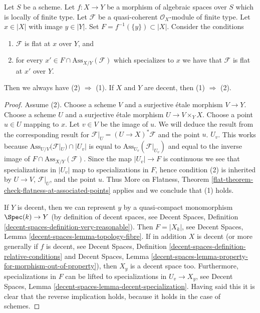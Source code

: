 \begin{theorem}
\label{theorem-check-flatness-at-associated-points}
Let $S$ be a scheme.
Let $f : X \to Y$ be a morphism of algebraic spaces over $S$
which is locally of finite type.
Let $\mathcal{F}$ be a quasi-coherent $\mathcal{O}_X$-module of finite type.
Let $x \in |X|$ with image $y \in |Y|$.
Set $F = f^{-1}(\{y\}) \subset |X|$.
Consider the conditions
\begin{enumerate}
\item $\mathcal{F}$ is flat at $x$ over $Y$, and
\item for every $x' \in F \cap \text{Ass}_{X/Y}(\mathcal{F})$ which
specializes to $x$ we have that $\mathcal{F}$ is flat at $x'$ over $Y$.
\end{enumerate}
Then we always have (2) $\Rightarrow$ (1). If $X$ and $Y$ are
decent, then (1) $\Rightarrow$ (2).
\end{theorem}

\begin{proof}
Assume (2).
Choose a scheme $V$ and a surjective \'etale morphism $V \to Y$.
Choose a scheme $U$ and a surjective \'etale morphism $U \to V \times_Y X$.
Choose a point $u \in U$ mapping to $x$. Let $v \in V$ be the image of $u$.
We will deduce the result from the corresponding result for
$\mathcal{F}|_U = (U \to X)^*\mathcal{F}$ and the point $u$.
$U_v$. This works because $\text{Ass}_{U/V}(\mathcal{F}|_U) \cap |U_v|$
is equal to $\text{Ass}_{U_v}(\mathcal{F}|_{U_v})$ and equal to the inverse
image of $F \cap \text{Ass}_{X/Y}(\mathcal{F})$.
Since the map $|U_v| \to F$ is continuous we see that
specializations in $|U_v|$ map to specializations in $F$,
hence condition (2) is inherited by $U \to V$,
$\mathcal{F}|_U$, and the point $u$.
Thus More on Flatness, Theorem
\ref{flat-theorem-check-flatness-at-associated-points} applies
and we conclude that (1) holds.

\medskip\noindent
If $Y$ is decent, then we can represent
$y$ by a quasi-compact monomorphism $\Spec(k) \to Y$
(by definition of decent spaces, see
Decent Spaces, Definition \ref{decent-spaces-definition-very-reasonable}).
Then $F = |X_k|$, see
Decent Spaces, Lemma \ref{decent-spaces-lemma-topology-fibre}.
If in addition $X$ is decent (or more generally if $f$ is decent, see
Decent Spaces, Definition \ref{decent-spaces-definition-relative-conditions}
and Decent Spaces, Lemma
\ref{decent-spaces-lemma-property-for-morphism-out-of-property}),
then $X_y$ is a decent space too. Furthermore, specializations in
$F$ can be lifted to specializations
in $U_v \to X_y$, see
Decent Spaces, Lemma \ref{decent-spaces-lemma-decent-specialization}.
Having said this it is clear that the reverse implication
holds, because it holds in the case of schemes.
\end{proof}

